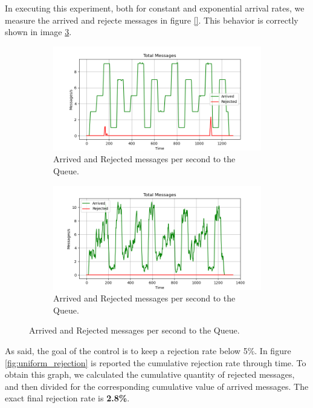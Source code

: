 In executing this experiment, both for constant and exponential arrival rates, we measure the arrived and rejecte messages in figure \ref{}.
This behavior is correctly shown in image \ref{fig:uniform_messages}.
\begin{figure}[H]
	\begin{subfigure}{0.85\linewidth}
	    \centering
	    \includegraphics[width=0.85\linewidth]{images/default/constant/messages.png}
	    \caption{Arrived and Rejected messages per second to the Queue.}
	    \label{fig:uniform_messages}
	\end{subfigure}
	\begin{subfigure}{0.85\linewidth}
	    \centering
    		\includegraphics[width=0.85\linewidth]{images/default/exponential/messages.png}
	    \caption{Arrived and Rejected messages per second to the Queue.}
    		\label{fig:uniform_messages}
	\end{subfigure}
\end{figure}
As said, the goal of the control is to keep a rejection rate below 5\%. In figure \ref{fig:uniform_rejection} is reported the cumulative rejection rate through time. To obtain this graph, we calculated the cumulative quantity of rejected messages, and then divided for the corresponding cumulative value of arrived messages. The exact final rejection rate is \textbf{2.8\%}.

